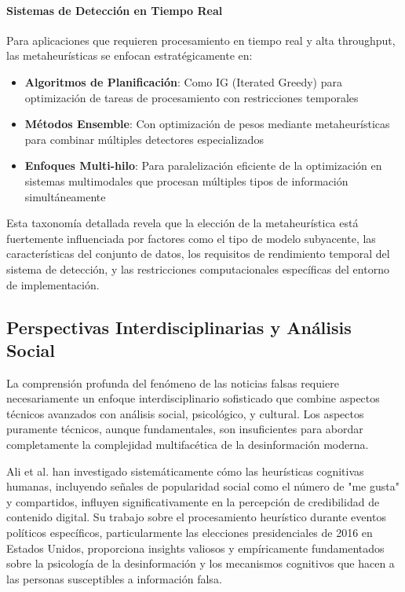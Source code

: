 \paragraph{Sistemas de Detección en Tiempo Real}
Para aplicaciones que requieren procesamiento en tiempo real y alta throughput, las metaheurísticas se enfocan estratégicamente en:
\begin{itemize}
    \item \textbf{Algoritmos de Planificación}: Como IG (Iterated Greedy) para optimización de tareas de procesamiento con restricciones temporales \cite{aqil2021modeling}
    \item \textbf{Métodos Ensemble}: Con optimización de pesos mediante metaheurísticas para combinar múltiples detectores especializados \cite{das2022heuristic, yasmin2024ensemble}
    \item \textbf{Enfoques Multi-hilo}: Para paralelización eficiente de la optimización en sistemas multimodales que procesan múltiples tipos de información simultáneamente \cite{yildirim2023novel}
\end{itemize}

Esta taxonomía detallada revela que la elección de la metaheurística está fuertemente influenciada por factores como el tipo de modelo subyacente, las características del conjunto de datos, los requisitos de rendimiento temporal del sistema de detección, y las restricciones computacionales específicas del entorno de implementación.

\subsection{Perspectivas Interdisciplinarias y Análisis Social}

La comprensión profunda del fenómeno de las noticias falsas requiere necesariamente un enfoque interdisciplinario sofisticado que combine aspectos técnicos avanzados con análisis social, psicológico, y cultural. Los aspectos puramente técnicos, aunque fundamentales, son insuficientes para abordar completamente la complejidad multifacética de la desinformación moderna.

Ali et al. \cite{ali2021fake, ali2020posttruth} han investigado sistemáticamente cómo las heurísticas cognitivas humanas, incluyendo señales de popularidad social como el número de "me gusta" y compartidos, influyen significativamente en la percepción de credibilidad de contenido digital. Su trabajo sobre el procesamiento heurístico durante eventos políticos específicos, particularmente las elecciones presidenciales de 2016 en Estados Unidos, proporciona insights valiosos y empíricamente fundamentados sobre la psicología de la desinformación y los mecanismos cognitivos que hacen a las personas susceptibles a información falsa.

